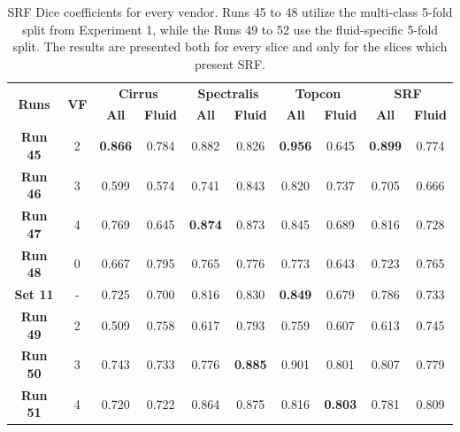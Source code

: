\begin{table}[!ht]
	\caption{SRF Dice coefficients for every vendor. Runs 45 to 48 utilize the multi-class 5-fold split from Experiment 1, while the Runs 49 to 52 use the fluid-specific 5-fold split. The results are presented both for every slice and only for the slices which present SRF.}
	\centering
	\begin{tabular}{|c|c|cc|cc|cc|cc|}
		\hline
		\multirow{2}{*}{\textbf{Runs}} &
		\multirow{2}{*}{\textbf{VF}} & 
		\multicolumn{2}{c|}{\textbf{Cirrus}} & 
		\multicolumn{2}{c|}{\textbf{Spectralis}} & 
		\multicolumn{2}{c|}{\textbf{Topcon}} & 
		\multicolumn{2}{c|}{\textbf{SRF}} \\ 
		\cline{3-10} & &
		\multicolumn{1}{c}{\textbf{All}} &  
		\textbf{\textbf{Fluid}} & 
		\multicolumn{1}{c}{\textbf{All}} &  
		\textbf{\textbf{Fluid}} & 
		\multicolumn{1}{c}{\textbf{All}} & 
		\textbf{\textbf{Fluid}} & 
		\multicolumn{1}{c}{\textbf{All}} & 
		\textbf{\textbf{Fluid}}\\ 
		
		\hline
		
		\textbf{Run 45} & 2 & \textbf{0.866} & 0.784 & 0.882 & 0.826 & \textbf{0.956} & 0.645 & \textbf{0.899} & 0.774 \\
		
		\textbf{Run 46} & 3 & 0.599 & 0.574 & 0.741 & 0.843 & 0.820 & 0.737 & 0.705 & 0.666 \\
		
		\textbf{Run 47} & 4 & 0.769 & 0.645 & \textbf{0.874} & 0.873 & 0.845 & 0.689 & 0.816 & 0.728 \\
		
		\textbf{Run 48} & 0 & 0.667 & 0.795 & 0.765 & 0.776 & 0.773 & 0.643 & 0.723 & 0.765 \\
		
		\hline
		
		\textbf{Set 11} & - & 0.725 & 0.700 & 0.816 & 0.830 & \textbf{0.849} & 0.679 & 0.786 & 0.733 \\
		
		\hline		
		\hline
		
		\textbf{Run 49} & 2 & 0.509 & 0.758 & 0.617 & 0.793 & 0.759 & 0.607 & 0.613 & 0.745 \\
		
		\textbf{Run 50} & 3 & 0.743 & 0.733 & 0.776 & \textbf{0.885} & 0.901 & 0.801 & 0.807 & 0.779 \\
		
		\textbf{Run 51} & 4 & 0.720 & 0.722 & 0.864 & 0.875 & 0.816 & \textbf{0.803} & 0.781 & 0.809 \\
		

\end{tabular}
\end{table}

